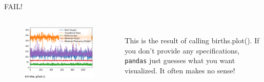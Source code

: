 \documentclass[aspectratio=169]{../latex_main/tntbeamer}  %
\begin{document}
	\begin{frame}{FAIL!}
	    \begin{columns}
            \begin{column}{.5\textwidth}
            \begin{figure}
                       \includegraphics[scale=.35]{Bild50}
                \end{figure}
            \end{column}
            
            
            \begin{column}{.5\textwidth}
                \\
                \bigskip
                \bigskip
               This is the result of calling births.plot(). If you don’t provide any specifications, \texttt{pandas} just guesses what you want visualized. It often makes no sense!

            \end{column}
        \end{columns}
	\end{frame}
	
	
\end{document}
